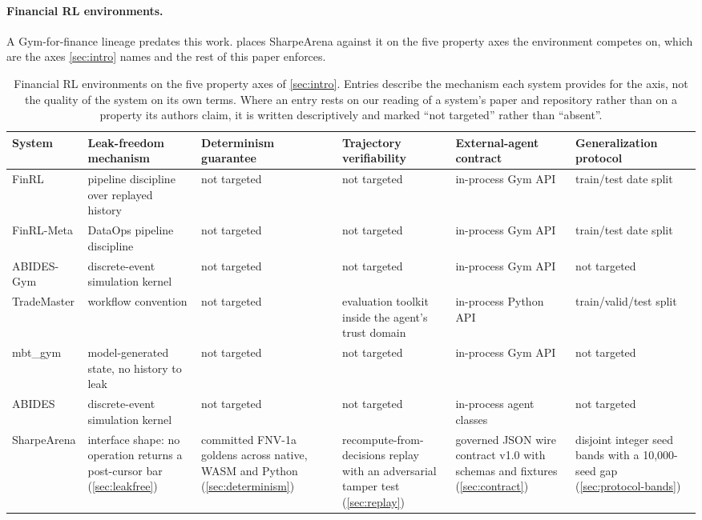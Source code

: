 \paragraph{Financial RL environments.} A Gym-for-finance lineage predates this work.  places SharpeArena against it on the five property axes the environment competes on, which are the axes \cref{sec:intro} names and the rest of this paper enforces.

\begin{table}[t]
\centering
\caption{Financial RL environments on the five property axes of \cref{sec:intro}. Entries describe the mechanism each system provides for the axis, not the quality of the system on its own terms. Where an entry rests on our reading of a system's paper and repository rather than on a property its authors claim, it is written descriptively and marked ``not targeted'' rather than ``absent''.}
\label{tab:related}
\scriptsize
\setlength{\tabcolsep}{3.5pt}
\begin{tabular}{p{1.55cm} p{2.1cm} p{2.0cm} p{2.1cm} p{2.1cm} p{2.0cm}}
\toprule
System & Leak-freedom mechanism & Determinism guarantee & Trajectory verifiability & External-agent contract & Generalization protocol \\
\midrule
FinRL \citep{liu2020finrl} & pipeline discipline over replayed history & not targeted & not targeted & in-process Gym API & train/test date split \\
FinRL-Meta \citep{liu2022finrlmeta} & DataOps pipeline discipline & not targeted & not targeted & in-process Gym API & train/test date split \\
ABIDES-Gym \citep{amrouni2021abidesgym} & discrete-event simulation kernel & not targeted & not targeted & in-process Gym API & not targeted \\
TradeMaster \citep{sun2023trademaster} & workflow convention & not targeted & evaluation toolkit inside the agent's trust domain & in-process Python API & train/valid/test split \\
mbt\_gym \citep{jerome2023mbtgym} & model-generated state, no history to leak & not targeted & not targeted & in-process Gym API & not targeted \\
ABIDES \citep{byrd2020abides} & discrete-event simulation kernel & not targeted & not targeted & in-process agent classes & not targeted \\
SharpeArena & interface shape: no operation returns a post-cursor bar (\cref{sec:leakfree}) & committed FNV-1a goldens across native, WASM and Python (\cref{sec:determinism}) & recompute-from-decisions replay with an adversarial tamper test (\cref{sec:replay}) & governed JSON wire contract v1.0 with schemas and fixtures (\cref{sec:contract}) & disjoint integer seed bands with a 10{,}000-seed gap (\cref{sec:protocol-bands}) \\
\bottomrule
\end{tabular}
\end{table}

